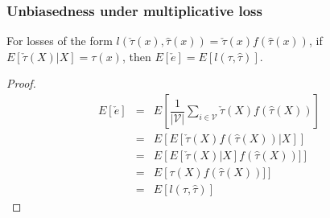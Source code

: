 \begin{comment}
    \begin{theorem}
    If $\check\tau_i$ is unbiased and consistent for $\tau_i$, then $\underset{m}{\emph{argmin}}\frac{1}{|\mathcal{V}|}\sum_{i \in \mathcal{V}}^{|\mathcal{V}|}  (\hat \tau_m(x_i) - \check \tau_i)^2$ is a consistent estimator of $\underset{m}{\emph{argmin}} \ E[(\hat\tau_m(X) - \tau(X))^2]$.
    \end{theorem}
    
    \begin{proof}
    
    ($^*$waves hands$^*$) The value of the estimated error for a model $\hat\tau_m$ is $\check e_m = \frac{1}{|\mathcal{V}|}\sum_{i \in \mathcal{V}}^{|\mathcal{V}|}  (\hat \tau_m(x_i) - \check \tau_i)^2 $. As $n$ goes to infinity, this should converge in probability to its expected value, which is a constant $e_m + d$, where $e_m$ is the true generalization error $E[(\tau(X) - \hat\tau(X))^2]$ and $d=E[(\tau(X) - \check\tau(X))^2]$ is a constant that doesn't depend on the model. We compare two models $\hat\tau_A$ and $\hat\tau_B$ on the basis of their estimated error $\check e_A$ and $\check e_B$. In the limit, $\check e_A > \check e_B \iff  e_A + d >  e_B + d \iff  e_A >  e_B$ ($^*$waves hands$^*$) 
    
    \end{proof}
\end{comment}

\subsubsection{Unbiasedness under multiplicative loss}

\begin{theorem}
For losses of the form $l(\check\tau(x), \hat\tau(x)) = \check\tau(x) f(\hat\tau(x))$, if $E[\check\tau(X)|X] = \tau(x)$, then $E[\check e] = E [  l(\tau, \hat\tau) ]$.
\end{theorem}

\begin{proof}

\[
\begin{array}{rcl}
	E[\check e] & = & E \left[ \dfrac{1}{| \mathcal V |} \sum_{i \in \mathcal V} \check\tau(X) f(\hat\tau(X)) \right] \\
	& = & E \left[  E[ \check\tau(X) f(\hat\tau(X)) | X] \right] \\
	& = & E \left[  E[ \check\tau(X)|X] f(\hat\tau(X))] \right] \\
	& = & E \left[  \tau(X) f(\hat\tau(X))] \right] \\
	& = & E [  l(\tau, \hat\tau) ]
\end{array}
\]

\end{proof}

